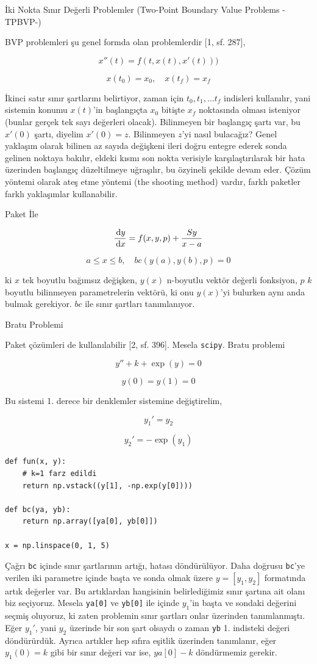 \documentclass[12pt,fleqn]{article}\usepackage{../../common}
\begin{document}
İki Nokta Sınır Değerli Problemler (Two-Point Boundary Value Problems -TPBVP-)

BVP problemleri şu genel formda olan problemlerdir [1, sf. 287],

$$ 
x''(t) = f(t, x(t), x'(t)))
$$

$$x(t_0) = x_0, \quad x(t_f) = x_f$$ 

İkinci satır sınır şartlarını belirtiyor, zaman için $t_0,t_1,...t_f$
indisleri kullanılır, yani sistemin konumu $x(t)$'in başlangıçta $x_0$
bitişte $x_f$ noktasında olması isteniyor (bunlar gerçek tek sayı değerleri
olacak). Bilinmeyen bir başlangıç şartı var, bu $x'(0)$ şartı, diyelim
$x'(0) = z$. Bilinmeyen $z$'yi nasıl bulacağız? Genel yaklaşım olarak
bilinen az sayıda değişkeni ileri doğru entegre ederek sonda gelinen
noktaya bakılır, eldeki kısmı son nokta verisiyle karşılaştırılarak bir
hata üzerinden başlangıç düzeltilmeye uğraşılır, bu özyineli şekilde devam
eder. Çözüm yöntemi olarak ateş etme yöntemi (the shooting method) vardır,
farklı paketler farklı yaklaşımlar kullanabilir. 

Paket İle

$$
\frac{\,\mathrm{d} y}{\,\mathrm{d} x} = f(x, y, p) + \frac{S y}{x-a}
$$

$$
a \le x \le b, \quad bc(y(a), y(b), p) = 0
$$

ki $x$ tek boyutlu bağımsız değişken, $y(x)$ n-boyutlu vektör değerli
fonksiyon, $p$ $k$ boyutlu bilinmeyen parametrelerin vektörü, ki onu
$y(x)$'yi bulurken aynı anda bulmak gerekiyor. $bc$ ile sınır şartları
tanımlanıyor.


Bratu Problemi

Paket çözümleri de kullanılabilir [2, sf. 396]. Mesela \verb!scipy!. Bratu
problemi

$$
y'' + k + \exp(y) = 0
$$

$$
y(0) = y(1) = 0
$$

Bu sistemi 1. derece bir denklemler sistemine değiştirelim,

$$
y_1' = y_2
$$

$$
y_2' = -\exp(y_1)
$$

\begin{verbatim}
def fun(x, y):
    # k=1 farz edildi
    return np.vstack((y[1], -np.exp(y[0])))

def bc(ya, yb):
    return np.array([ya[0], yb[0]])

x = np.linspace(0, 1, 5)
\end{verbatim}

Çağrı \verb!bc! içinde sınır şartlarının artığı, hatası döndürülüyor. Daha
doğrusu \verb!bc!'ye verilen iki parametre içinde başta ve sonda olmak
üzere $y = [y_1,y_2]$ formatında artık değerler var. Bu artıklardan
hangisinin belirlediğimiz sınır şartına ait olanı biz seçiyoruz. Mesela
\verb!ya[0]! ve \verb!yb[0]! ile içinde $y_1$'in başta ve sondaki değerini
seçmiş oluyoruz, ki zaten problemin sınır şartları onlar üzerinden
tanımlanmıştı. Eğer $y_1'$, yani $y_2$ üzerinde bir son şart olsaydı o
zaman \verb!yb! 1. indisteki değeri döndürürdük. Ayrıca artıkler hep sıfıra
eşitlik üzerinden tanımlanır, eğer $y_1(0)=k$ gibi bir sınır değeri var
ise, $ya[0]-k$ döndürmemiz gerekir.
\end{document}
